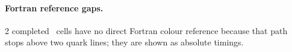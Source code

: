 \begin{landscape}
\paragraph{Fortran reference gaps.}
\noindent\scriptsize 2 completed \PAC\ cells have no direct Fortran colour reference because that path stops above two quark lines; they are shown as absolute timings.
\par\vspace{0.15em}
\end{landscape}
